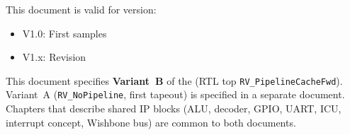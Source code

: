 This document is valid for \aschip \; version:
\begin{itemize}
  \item V1.0: First samples
  \item V1.x: Revision
\end{itemize}

This document specifies \textbf{Variant~B} of the \aschip{} (RTL top
\texttt{RV\_PipelineCacheFwd}). Variant~A (\texttt{RV\_NoPipeline}, first
tapeout) is specified in a separate document.
Chapters that describe shared IP blocks (ALU, decoder, GPIO, UART, ICU,
interrupt concept, Wishbone bus) are common to both documents.
